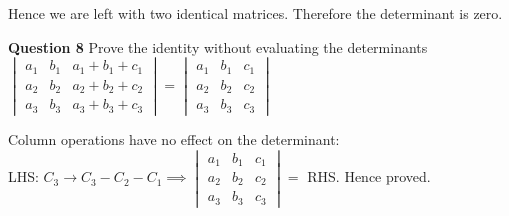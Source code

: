 \documentclass[addpoints]{exam}
\begin{document}
\begin{sloppypar}
\begin{questions}
\begin{solution}
            Hence we are left with two identical matrices. Therefore the determinant is zero.
        \end{solution}
        \pagebreak
        \question
        \textbf{Question 8} Prove the identity without evaluating the determinants \\ 
        $ \begin{vmatrix}
            a_1 & b_1 & a_1 + b_1 + c_1 \\ 
            a_2 & b_2 & a_2 + b_2 + c_2 \\ 
            a_3 & b_3 & a_3 + b_3 + c_3
        \end{vmatrix} = \begin{vmatrix}
            a_1 & b_1 & c_1 \\
            a_2 & b_2 & c_2 \\ 
            a_3 & b_3 & c_3 
        \end{vmatrix}$
        \begin{solution}
            Column operations have no effect on the determinant: \\
            LHS: 
            $ C_3 \rightarrow C_3 - C_2 - C_1 \implies \begin{vmatrix}
                a_1 & b_1 & c_1 \\
                a_2 & b_2 & c_2 \\ 
                a_3 & b_3 & c_3 
            \end{vmatrix} = $ RHS. Hence proved.
        \end{solution}
        

\end{questions}
\end{sloppypar}
\end{document}
